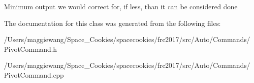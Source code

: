 Minimum output we would correct for, if less, than it can be considered done 

The documentation for this class was generated from the following files\+:\begin{DoxyCompactItemize}
\item 
/\+Users/maggiewang/\+Space\+\_\+\+Cookies/spacecookies/frc2017/src/\+Auto/\+Commands/Pivot\+Command.\+h\item 
/\+Users/maggiewang/\+Space\+\_\+\+Cookies/spacecookies/frc2017/src/\+Auto/\+Commands/Pivot\+Command.\+cpp\end{DoxyCompactItemize}

